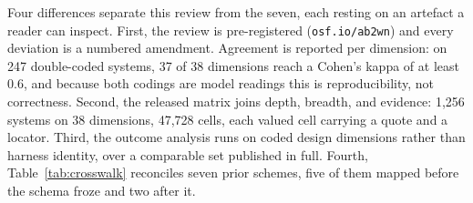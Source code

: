 Four differences separate this review from the seven, each resting on an artefact a reader can inspect.
First, the review is pre-registered (\texttt{osf.io/ab2wn}) and every deviation is a numbered amendment.
Agreement is reported per dimension: on 247 double-coded systems, 37 of 38 dimensions reach a Cohen's
kappa of at least 0.6, and because both codings are model readings this is reproducibility, not correctness.
Second, the released matrix joins depth, breadth, and evidence: 1,256 systems on 38 dimensions, 47,728
cells, each valued cell carrying a quote and a locator. Third, the outcome analysis runs on coded design dimensions rather than
harness identity, over a comparable set published in full. Fourth, Table~\ref{tab:crosswalk} reconciles
seven prior schemes, five of them mapped before the schema froze and two after it.
